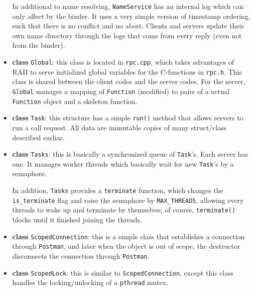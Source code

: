 \begin{itemize}
In additional to name resolving, {\tt NameService} has an internal log which can only affect by the binder.
It uses a very simple version of timestamp ordering, such that there is no conflict and no abort.
Clients and servers update their own name directory through the logs that come from every reply (even not from the binder).

\item
{\bf class} {\tt Global}: this class is located in {\tt rpc.cpp}, which takes advantages of RAII to serve initialized global variables for the C-functions in {\tt rpc.h}.
This class is shared between the client codes and the server codes.
For the server, {\tt Global} manages a mapping of {\tt Function} (modified) to pairs of a actual {\tt Function} object and a skeleton function.

\item
{\bf class} {\tt Task}: this structure has a simple {\tt run()} method that allows servers to run a call request.
All data are immutable copies of many struct/class described earliar.

\item
{\bf class} {\tt Tasks}: this is basically a synchronized queue of {\tt Task}'s.
Each server has one.
It manages worker threads which basically wait for new {\tt Task}'s by a semaphore.

In addition, {\tt Tasks} provides a {\tt terminate{}} function, which changes the {\tt is\_terminate} flag and raise the semaphore by {\tt MAX\_THREADS}, allowing every threads to wake up and terminate by themselves; of course, {\tt terminate()} blocks until it finished joining the threads.

\item
{\bf class} {\tt ScopedConnection}: this is a simple class that establishes a connection through {\tt Postman}, and later when the object is out of scope, the destructor disconnects the connection through {\tt Postman}.

\item
{\bf class} {\tt ScopedLock}: this is similar to {\tt ScopedConnection}, except this class handles the locking/unlocking of a {\tt pthread} mutex.

\end{itemize}

